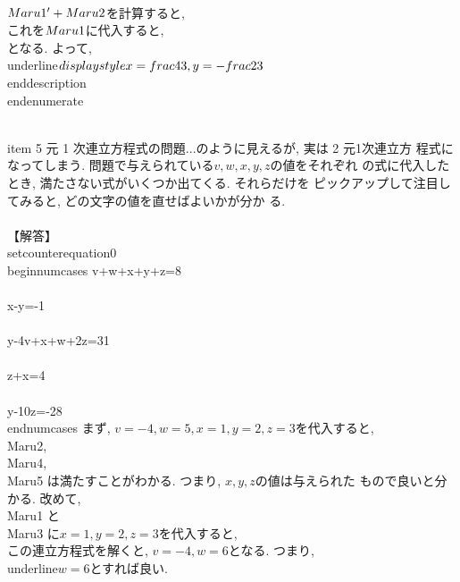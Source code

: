 			  \\[
			   5x-5y=10 \\tag{\\Maru{1}'}
			  \\]
			  $\\Maru{1}'+\\Maru{2}$を計算すると,
			  \\[
			   9x=12 \\Leftrightarrow x=\\frac{4}{3}
			  \\]
			  これを$\\Maru{1}$に代入すると,
			  \\[
			   \\frac{4}{3}-y=2 \\Leftrightarrow y=-\\frac{2}{3}
			  \\]
			  となる. よって, \\underline{$\\displaystyle
			  x=\\frac{4}{3}, y=-\\frac{2}{3}$}
	      \\end{description}
       \\end{enumerate}

 \\item 5 元 1 次連立方程式の問題...のように見えるが, 実は 2 元1次連立方
       程式になってしまう. 問題で与えられている$v,w,x,y,z$の値をそれぞれ
       の式に代入したとき, 満たさない式がいくつか出てくる. それらだけを
       ピックアップして注目してみると, どの文字の値を直せばよいかが分か
       る. \\\\
       【解答】
       \\setcounter{equation}{0}
       \\begin{numcases}{}
	v+w+x+y+z=8\\\\
	x-y=-1\\\\
	y-4v+x+w+2z=31\\\\
	z+x=4\\\\
	y-10z=-28
       \\end{numcases}
       まず, $v=-4, w=5, x=1, y=2, z=3$を代入すると, \\Maru{2}, \\Maru{4},
       \\Maru{5} は満たすことがわかる. つまり, $x, y, z$の値は与えられた
       もので良いと分かる. 改めて, \\Maru{1} と \\Maru{3} に$x=1, y=2,
       z=3$を代入すると,
       \\[
	\\begin{cases}
	 v+w=2\\\\
	 -4v+w=22
	\\end{cases}
       \\]
       この連立方程式を解くと, $v=-4, w=6$となる. つまり,
       \\underline{$w=6$}とすれば良い.

